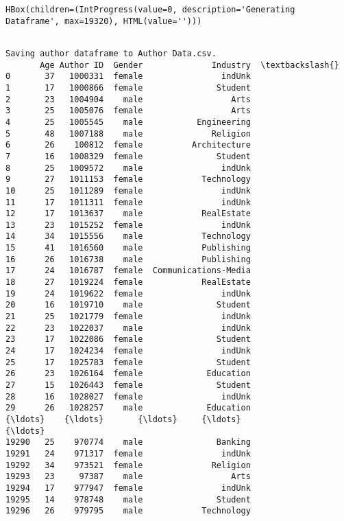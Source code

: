 \documentclass[11pt]{article}
\begin{document}
    
    \begin{verbatim}
HBox(children=(IntProgress(value=0, description='Generating Dataframe', max=19320), HTML(value='')))
    \end{verbatim}

    
    \begin{Verbatim}[commandchars=\\\{\}]

Saving author dataframe to Author Data.csv.
       Age Author ID  Gender              Industry  \textbackslash{}
0       37   1000331  female                indUnk   
1       17   1000866  female               Student   
2       23   1004904    male                  Arts   
3       25   1005076  female                  Arts   
4       25   1005545    male           Engineering   
5       48   1007188    male              Religion   
6       26    100812  female          Architecture   
7       16   1008329  female               Student   
8       25   1009572    male                indUnk   
9       27   1011153  female            Technology   
10      25   1011289  female                indUnk   
11      17   1011311  female                indUnk   
12      17   1013637    male            RealEstate   
13      23   1015252  female                indUnk   
14      34   1015556    male            Technology   
15      41   1016560    male            Publishing   
16      26   1016738    male            Publishing   
17      24   1016787  female  Communications-Media   
18      27   1019224  female            RealEstate   
19      24   1019622  female                indUnk   
20      16   1019710    male               Student   
21      25   1021779  female                indUnk   
22      23   1022037    male                indUnk   
23      17   1022086  female               Student   
24      17   1024234  female                indUnk   
25      17   1025783  female               Student   
26      23   1026164  female             Education   
27      15   1026443  female               Student   
28      16   1028027  female                indUnk   
29      26   1028257    male             Education   
{\ldots}    {\ldots}       {\ldots}     {\ldots}                   {\ldots}   
19290   25    970774    male               Banking   
19291   24    971317  female                indUnk   
19292   34    973521  female              Religion   
19293   23     97387    male                  Arts   
19294   17    977947  female                indUnk   
19295   14    978748    male               Student   
19296   26    979795    male            Technology   

\end{Verbatim}
\end{document}
